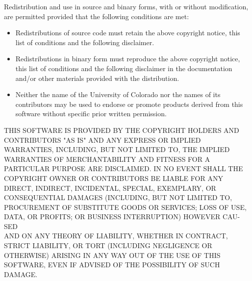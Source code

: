 \documentclass[a4paper,10pt]{scrartcl}
\begin{document}
Redistribution and use in source and binary forms, with or without
modification, are permitted provided that the following conditions
are met:

\begin{itemize}
\item
Redistributions of source code must retain the above copyright
notice, this list of conditions and the following disclaimer.
\item
Redistributions in binary form must reproduce the above copyright
notice, this list of conditions and the following disclaimer in the
documentation and/or other materials provided with the distribution.
\item
Neither the name of the University of Colorado nor the names of its
contributors may be used to endorse or promote products derived from
this software without specific prior written permission.
\end{itemize}
THIS SOFTWARE IS PROVIDED BY THE COPYRIGHT HOLDERS AND CONTRIBUTORS
"AS IS" AND ANY EXPRESS OR IMPLIED WARRAN\-TIES, INCLUDING, BUT NOT
LIMITED TO, THE IMPLIED WARRANTIES OF MERCHANTABILITY AND FITNESS
FOR A PARTICULAR PURPOSE ARE DISCLAIMED. IN NO EVENT SHALL THE
COPYRIGHT OWNER OR CONTRIBUTORS BE LIABLE FOR ANY DIRECT, INDIRECT,
INCIDENTAL, SPECIAL, EXEMPLARY, OR CONSEQUENTIAL DAMAGES (INCLUDING,
BUT NOT LIMITED TO, PROCUREMENT OF SUBSTITUTE GOODS OR SERVICES;
LOSS OF USE, DATA, OR PROFITS; OR BUSINESS INTERRUPTION) HOWEVER
CAU-SED
\\ AND ON ANY THEORY OF LIABILITY, WHETHER IN CONTRACT, STRICT
LIABILITY, OR TORT (INCLUDING NEGLIGENCE OR OTHERWISE) ARISING IN
ANY WAY OUT OF THE USE OF THIS SOFTWARE, EVEN IF ADVISED OF THE
POSSIBILITY OF SUCH DAMAGE.




\end{document}
